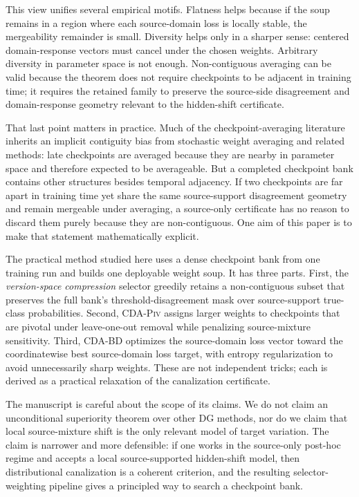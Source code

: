 \documentclass{article}
\theoremstyle{definition}
\newcommand{\piv}{\textup{\textsc{CDA-Piv}}}
\newcommand{\bd}{\textup{\textsc{CDA-BD}}}
\begin{document}
This view unifies several empirical motifs. Flatness helps because if the soup remains in a region where each source-domain loss is locally stable, the mergeability remainder is small. Diversity helps only in a sharper sense: centered domain-response vectors must cancel under the chosen weights. Arbitrary diversity in parameter space is not enough. Non-contiguous averaging can be valid because the theorem does not require checkpoints to be adjacent in training time; it requires the retained family to preserve the source-side disagreement and domain-response geometry relevant to the hidden-shift certificate.

That last point matters in practice. Much of the checkpoint-averaging literature inherits an implicit contiguity bias from stochastic weight averaging and related methods: late checkpoints are averaged because they are nearby in parameter space and therefore expected to be averageable. But a completed checkpoint bank contains other structures besides temporal adjacency. If two checkpoints are far apart in training time yet share the same source-support disagreement geometry and remain mergeable under averaging, a source-only certificate has no reason to discard them purely because they are non-contiguous. One aim of this paper is to make that statement mathematically explicit.

The practical method studied here uses a dense checkpoint bank from one training run and builds one deployable weight soup. It has three parts. First, the \emph{version-space compression} selector greedily retains a non-contiguous subset that preserves the full bank's threshold-disagreement mask over source-support true-class probabilities. Second, \piv{} assigns larger weights to checkpoints that are pivotal under leave-one-out removal while penalizing source-mixture sensitivity. Third, \bd{} optimizes the source-domain loss vector toward the coordinatewise best source-domain loss target, with entropy regularization to avoid unnecessarily sharp weights. These are not independent tricks; each is derived as a practical relaxation of the canalization certificate.

The manuscript is careful about the scope of its claims. We do not claim an unconditional superiority theorem over other DG methods, nor do we claim that local source-mixture shift is the only relevant model of target variation. The claim is narrower and more defensible: if one works in the source-only post-hoc regime and accepts a local source-supported hidden-shift model, then distributional canalization is a coherent criterion, and the resulting selector-weighting pipeline gives a principled way to search a checkpoint bank.
\end{document}
